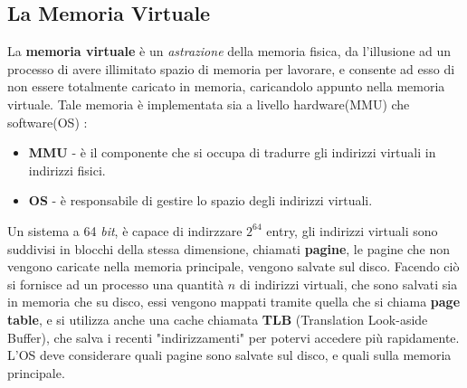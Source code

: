 \documentclass[12pt, letterpaper]{article}
\begin{document}
\subsection{La Memoria Virtuale}
La \textbf{memoria virtuale} è un \textit{astrazione} della memoria fisica, da l'illusione ad un processo di 
avere illimitato spazio di memoria per lavorare, e consente ad esso di non essere totalmente caricato 
in memoria, caricandolo appunto nella memoria virtuale. Tale memoria è implementata sia a livello 
hardware(MMU) che software(OS) :
\begin{itemize}
    \item \textbf{MMU} - è il componente che si occupa di tradurre gli indirizzi virtuali in indirizzi fisici.
    \item \textbf{OS} - è responsabile di gestire lo spazio degli indirizzi virtuali.
\end{itemize}
Un sistema a 64 \textit{bit}, è capace di indirzzare \(2^{64}\) entry, gli indirizzi virtuali sono 
suddivisi in blocchi della stessa dimensione, chiamati \textbf{pagine}, le pagine che non vengono caricate 
nella memoria principale, vengono salvate sul disco. Facendo ciò si fornisce ad un processo una quantità \(n\) di 
indirizzi virtuali, che sono salvati sia in memoria che su disco, essi vengono mappati tramite quella che si chiama 
\textbf{page table}, e si utilizza anche una cache chiamata \textbf{TLB} (Translation Look-aside Buffer), che salva 
i recenti "indirizzamenti" per potervi accedere più rapidamente. L'OS deve considerare quali pagine sono 
salvate sul disco, e quali sulla memoria principale.
\end{document}
